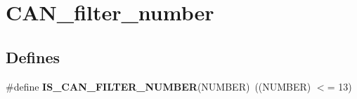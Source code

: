 \hypertarget{group__CAN__filter__number}{
\section{CAN\_\-filter\_\-number}
\label{group__CAN__filter__number}
}
\subsection*{Defines}
\begin{DoxyCompactItemize}
\item 
\hypertarget{group__CAN__filter__number_ga28d6c98a160d71059ed9a5973de2a4ef}{
\#define {\bfseries IS\_\-CAN\_\-FILTER\_\-NUMBER}(NUMBER)~((NUMBER) $<$= 13)}
\label{group__CAN__filter__number_ga28d6c98a160d71059ed9a5973de2a4ef}

\end{DoxyCompactItemize}
